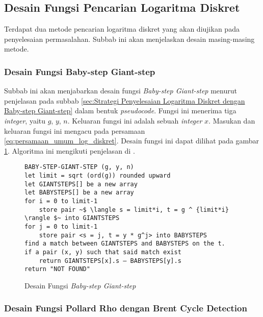 \subsection{Desain Fungsi Pencarian Logaritma Diskret}

Terdapat dua metode pencarian logaritma diskret yang akan diujikan pada penyelesaian permasalahan. Subbab ini akan menjelaskan desain masing-masing metode.

\subsubsection {Desain Fungsi Baby-step Giant-step}

Subbab ini akan menjabarkan desain fungsi \textit{Baby-step Giant-step} menurut penjelasan pada subbab \ref{sec:Strategi Penyelesaian Logaritma Diskret dengan Baby-step Giant-step} dalam bentuk \textit{pseudocode}. Fungsi ini menerima tiga \textit{integer}, yaitu $ g $, $ y $, $ n $. Keluaran fungsi ini adalah sebuah \textit{integer} $ x $. Masukan dan keluaran fungsi ini mengacu pada persamaan \eqref{eq:persamaan_umum_log_diskret}. Desain fungsi ini dapat dilihat pada gambar \ref{psdo:bsgs}. Algoritma ini mengikuti penjelasan di \cite{hac_numtheory}.
\begin{figure}[h!]
\begin{lstlisting}[firstnumber=0]
BABY-STEP-GIANT-STEP (g, y, n)
let limit = sqrt (ord(g)) rounded upward
let GIANTSTEPS[] be a new array
let BABYSTEPS[] be a new array
for i = 0 to limit-1
	store pair ~$ \langle s = limit*i, t = g ^ {limit*i} \rangle $~ into GIANTSTEPS
for j = 0 to limit-1
	store pair <s = j, t = y * g^j> into BABYSTEPS
find a match between GIANTSTEPS and BABYSTEPS on the t.
if a pair (x, y) such that said match exist
	return GIANTSTEPS[x].s – BABYSTEPS[y].s
return "NOT FOUND"
\end{lstlisting}
\caption{Desain Fungsi \textit{Baby-step Giant-step}}
\label{psdo:bsgs}
\end{figure}

\subsubsection {Desain Fungsi Pollard Rho dengan Brent Cycle Detection}

